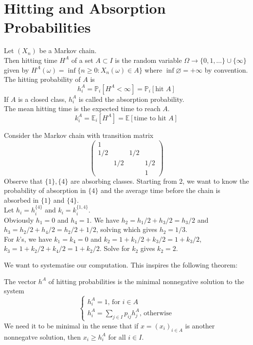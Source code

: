 \section{Hitting and Absorption Probabilities}
\begin{definition}
    Let $(X_n)$ be a Markov chain.\\
    Then hitting time $H^A$ of a set $A\subset I$ is the random variable $\Omega\to\{0,1,\ldots\}\cup\{\infty\}$ given by $H^A(\omega)=\inf\{n\ge 0:X_n(\omega)\in A\}$ where $\inf\varnothing=+\infty$ by convention.\\
    The hitting probability of $A$ is
    $$h_i^A=\mathbb P_i[H^A<\infty]=\mathbb P_i[\text{hit $A$}]$$
    If $A$ is a closed class, $h_i^A$ is called the absorption probability.\\
    The mean hitting time is the expected time to reach $A$.
    $$k_i^A=\mathbb E_i[H^A]=\mathbb E[\text{time to hit $A$}]$$
\end{definition}
\begin{example}
    Consider the Markov chain with transition matrix
    $$\begin{pmatrix}
        1&&&\\
        1/2&&1/2&\\
        &1/2&&1/2\\
        &&&1
    \end{pmatrix}$$
    Observe that $\{1\},\{4\}$ are absorbing classes.
    Starting from $2$, we want to know the probability of absorption in $\{4\}$ and the average time before the chain is absorbed in $\{1\}$ and $\{4\}$.\\
    Let $h_i=h_i^{\{4\}}$ and $k_i=k_i^{\{1,4\}}$.\\
    Obviously $h_1=0$ and $h_4=1$.
    We have $h_2=h_1/2+h_3/2=h_3/2$ and $h_3=h_2/2+h_4/2=h_2/2+1/2$, solving which gives $h_2=1/3$.\\
    For $k$'s, we have $k_1=k_4=0$ and $k_2=1+k_1/2+k_3/2=1+k_3/2$, $k_3=1+k_2/2+k_4/2=1+k_2/2$.
    Solve for $k_2$ gives $k_2=2$.
\end{example}
We want to systematise our computation.
This inspires the following theorem:
\begin{theorem}
    The vector $h^A$ of hitting probabilities is the minimal nonnegative solution to the system
    $$\begin{cases}
        h_i^A=1\text{, for $i\in A$}\\
        h_i^A=\sum_{j\in I}p_{ij}h_j^A\text{, otherwise}
    \end{cases}$$
    We need it to be minimal in the sense that if $x=(x_i)_{i\in A}$ is another nonnegatve solution, then $x_i\ge h_i^A$ for all $i\in I$.
\end{theorem}
